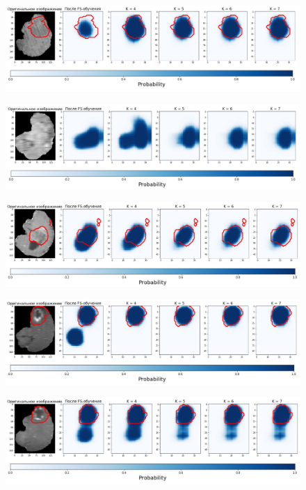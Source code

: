 \begin{figure}[h!] 
  \center
  \includegraphics [scale=0.7] {images/good_8.png}
\end{figure}

\begin{figure}[h!] 
  \center
  \includegraphics [scale=0.7] {images/good_9.png}
\end{figure}


\begin{figure}[h!] 
  \center
  \includegraphics [scale=0.7] {images/good_10.png}
\end{figure}

\begin{figure}[h!] 
  \center
  \includegraphics [scale=0.7] {images/good_11.png}
\end{figure}

\begin{figure}[h!] 
  \center
  \includegraphics [scale=0.7] {images/good_12.png}
\end{figure}

